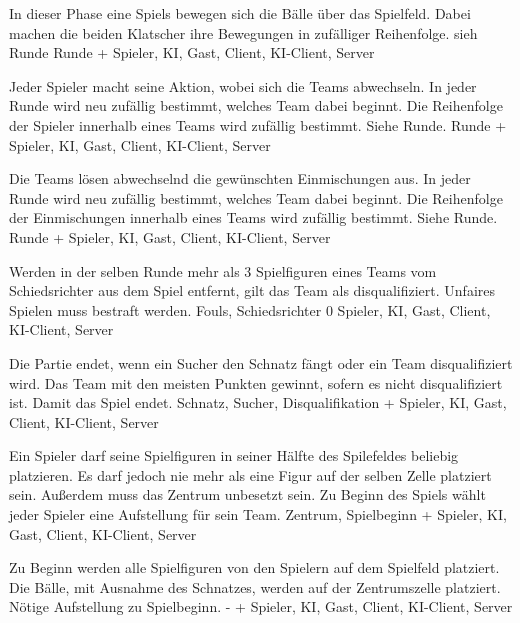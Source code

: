         {In dieser Phase eine Spiels bewegen sich die Bälle über das Spielfeld. Dabei machen die beiden Klatscher ihre Bewegungen in zufälliger Reihenfolge.}
        {sieh Runde}
        {Runde}
        {+}
        {Spieler, KI, Gast, Client, KI-Client, Server}
        
        {Jeder Spieler macht seine Aktion, wobei sich die Teams abwechseln. In jeder Runde wird neu zufällig bestimmt, welches Team dabei beginnt. Die Reihenfolge der Spieler innerhalb eines Teams wird zufällig bestimmt.}
        {Siehe Runde.}
        {Runde}
        {+}
        {Spieler, KI, Gast, Client, KI-Client, Server}
        
        {Die Teams lösen abwechselnd die gewünschten Einmischungen aus. In jeder Runde wird neu zufällig bestimmt, welches Team dabei beginnt. Die Reihenfolge der Einmischungen innerhalb eines Teams wird zufällig bestimmt.}
        {Siehe Runde.}
        {Runde}
        {+}
        {Spieler, KI, Gast, Client, KI-Client, Server}

        {Werden in der selben Runde mehr als 3 Spielfiguren eines Teams vom Schiedsrichter aus dem Spiel entfernt, gilt das Team als disqualifiziert.}
        {Unfaires Spielen muss bestraft werden.}
        {Fouls, Schiedsrichter}
        {0}
        {Spieler, KI, Gast, Client, KI-Client, Server}
        
        {Die Partie endet, wenn ein Sucher den Schnatz fängt oder ein Team disqualifiziert wird. Das Team mit den meisten Punkten gewinnt, sofern es nicht disqualifiziert ist.}
        {Damit das Spiel endet.}
        {Schnatz, Sucher, Disqualifikation}
        {+}
        {Spieler, KI, Gast, Client, KI-Client, Server}
        
        {Ein Spieler darf seine Spielfiguren in seiner Hälfte des Spilefeldes beliebig platzieren. Es darf jedoch nie mehr als eine Figur auf der selben Zelle platziert sein. Außerdem muss das Zentrum unbesetzt sein.}
        {Zu Beginn des Spiels wählt jeder Spieler eine Aufstellung für sein Team.}
        {Zentrum, Spielbeginn}
        {+}
        {Spieler, KI, Gast, Client, KI-Client, Server}	
        
        {Zu Beginn werden alle Spielfiguren von den Spielern auf dem Spielfeld platziert. Die Bälle, mit Ausnahme des Schnatzes, werden auf der Zentrumszelle platziert.}
        {Nötige Aufstellung zu Spielbeginn.}
        {-}
        {+}
        {Spieler, KI, Gast, Client, KI-Client, Server}
        
